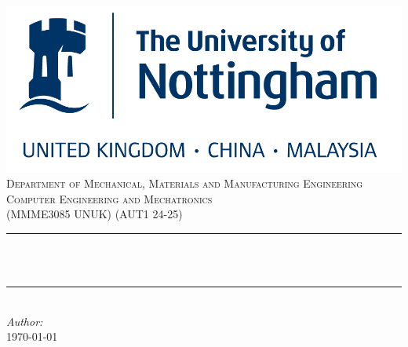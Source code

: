 \begin{titlepage}
    \centering
    \includegraphics[scale = 0.4]{Config/uon.png}\\[2 cm]	%

    
    \textsc{\Large Department of Mechanical, Materials and Manufacturing Engineering}\\[0.3 cm]	%
    \textsc{\large Computer Engineering and Mechatronics }\\[0.3 cm]				%
    \textsc{\large (MMME3085 UNUK) (AUT1 24-25)}\\[3 cm]				%

    \rule{\linewidth}{0.2 mm} \\[0.2 cm]
    { \huge \bfseries \thetitle}\\
    \rule{\linewidth}{0.2 mm} \\[3 cm]


    \large \emph{Author:} \theauthor \\[0.5 cm]


    {\large \today}\\[1 cm]

\end{titlepage}

